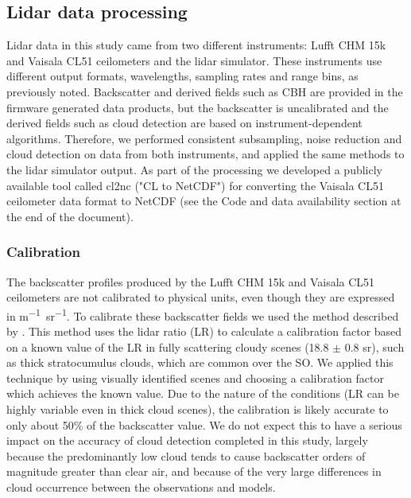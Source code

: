\subsection{Lidar data processing}
\label{sec:2:lidar-data-processing}

Lidar data in this study came from two different instruments: Lufft CHM 15k and
Vaisala CL51 ceilometers and the lidar simulator. These instruments use
different output formats, wavelengths, sampling rates and range bins, as
previously noted. Backscatter and derived fields such as CBH are provided in the
firmware generated data products, but the backscatter is uncalibrated and the
derived fields such as cloud detection are based on instrument-dependent
algorithms. Therefore, we performed consistent subsampling, noise reduction and
cloud detection on data from both instruments, and applied the same methods to
the lidar simulator output. As part of the processing we developed a publicly
available tool called cl2nc ("CL to NetCDF") for converting the Vaisala CL51
ceilometer data format to NetCDF (see the Code and data availability section at
the end of the document).

\subsubsection{Calibration}
\label{sec:2:calibration}

The backscatter profiles produced by the Lufft CHM 15k and Vaisala CL51
ceilometers are not calibrated to physical units, even though they are expressed
in \unit{m^{-1} sr^{-1}}. To calibrate these backscatter fields we used the
method described by \cite{oconnor2004}. This method uses the lidar ratio (LR) to
calculate a calibration factor based on a known value of the LR in fully
scattering cloudy scenes (18.8 $\pm$ 0.8 \unit{sr}), such as thick stratocumulus
clouds, which are common over the SO. We applied this technique by using
visually identified scenes and choosing a calibration factor which achieves the
known value. Due to the nature of the conditions (LR can be highly variable even
in thick cloud scenes), the calibration is likely accurate to only about 50\% of
the backscatter value. We do not expect this to have a serious impact on the
accuracy of cloud detection completed in this study, largely because the
predominantly low cloud tends to cause backscatter orders of magnitude greater
than clear air, and because of the very large differences in cloud occurrence
between the observations and models.

